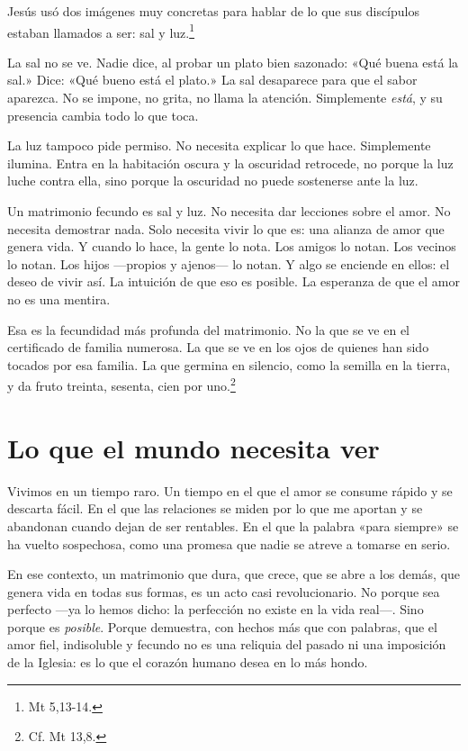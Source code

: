Jesús usó dos imágenes muy concretas para hablar de lo que sus discípulos estaban llamados a ser: sal y luz.\footnote{Mt 5,13-14.}

La sal no se ve. Nadie dice, al probar un plato bien sazonado: «Qué buena está la sal.» Dice: «Qué bueno está el plato.» La sal desaparece para que el sabor aparezca. No se impone, no grita, no llama la atención. Simplemente \emph{está}, y su presencia cambia todo lo que toca.

La luz tampoco pide permiso. No necesita explicar lo que hace. Simplemente ilumina. Entra en la habitación oscura y la oscuridad retrocede, no porque la luz luche contra ella, sino porque la oscuridad no puede sostenerse ante la luz.

Un matrimonio fecundo es sal y luz. No necesita dar lecciones sobre el amor. No necesita demostrar nada. Solo necesita vivir lo que es: una alianza de amor que genera vida. Y cuando lo hace, la gente lo nota. Los amigos lo notan. Los vecinos lo notan. Los hijos ---propios y ajenos--- lo notan. Y algo se enciende en ellos: el deseo de vivir así. La intuición de que eso es posible. La esperanza de que el amor no es una mentira.

Esa es la fecundidad más profunda del matrimonio. No la que se ve en el certificado de familia numerosa. La que se ve en los ojos de quienes han sido tocados por esa familia. La que germina en silencio, como la semilla en la tierra, y da fruto treinta, sesenta, cien por uno.\footnote{Cf. Mt 13,8.}

\section{Lo que el mundo necesita ver}

Vivimos en un tiempo raro. Un tiempo en el que el amor se consume rápido y se descarta fácil. En el que las relaciones se miden por lo que me aportan y se abandonan cuando dejan de ser rentables. En el que la palabra «para siempre» se ha vuelto sospechosa, como una promesa que nadie se atreve a tomarse en serio.

En ese contexto, un matrimonio que dura, que crece, que se abre a los demás, que genera vida en todas sus formas, es un acto casi revolucionario. No porque sea perfecto ---ya lo hemos dicho: la perfección no existe en la vida real---. Sino porque es \emph{posible}. Porque demuestra, con hechos más que con palabras, que el amor fiel, indisoluble y fecundo no es una reliquia del pasado ni una imposición de la Iglesia: es lo que el corazón humano desea en lo más hondo.

